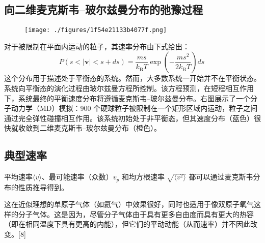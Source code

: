 \subsection{向二维麦克斯韦–玻尔兹曼分布的弛豫过程}
\begin{figure}[ht]
\centering
\texttt{[image: ./figures/1f54e21133b4077f.png]}
\caption{} \label{fig_MKBR_2}
\end{figure}
对于被限制在平面内运动的粒子，其速率分布由下式给出：
$$
P(s < |\mathbf{v}| < s + ds) = \frac{m s}{k_{\text{B}} T} \exp\left( -\frac{m s^2}{2 k_{\text{B}} T} \right) ds~
$$
这个分布用于描述处于平衡态的系统。然而，大多数系统一开始并不在平衡状态。系统向平衡态的演化过程由玻尔兹曼方程所控制。该方程预测，在短程相互作用下，系统最终的平衡速度分布将遵循麦克斯韦–玻尔兹曼分布。右图展示了一个分子动力学（MD）模拟：900 个硬球粒子被限制在一个矩形区域内运动，粒子之间通过完全弹性碰撞相互作用。该系统初始处于非平衡态，但其速度分布（蓝色）很快就收敛到二维麦克斯韦–玻尔兹曼分布（橙色）。
\subsection{典型速率}
平均速率$\langle v \rangle$、最可能速率（众数）$v_p$ 和均方根速率 $\sqrt{ \langle v^2 \rangle }$ 都可以通过麦克斯韦分布的性质推导得到。

这在近似理想的单原子气体（如氦气）中效果很好，同时也适用于像双原子氧气这样的分子气体。这是因为，尽管分子气体由于具有更多自由度而具有更大的热容（即在相同温度下具有更高的内能），但它们的平动动能（从而速率）并不因此改变。[8]
